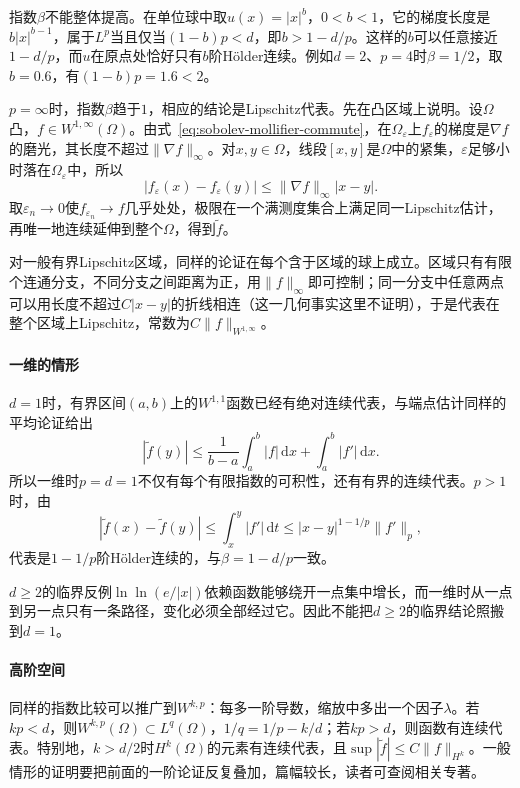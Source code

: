 指数$\beta$不能整体提高。在单位球中取$u(x)=|x|^b$，$0<b<1$，它的梯度长度是$b|x|^{b-1}$，属于$L^p$当且仅当$(1-b)p<d$，即$b>1-d/p$。这样的$b$可以任意接近$1-d/p$，而$u$在原点处恰好只有$b$阶Hölder连续。例如$d=2$、$p=4$时$\beta=1/2$，取$b=0.6$，有$(1-b)p=1.6<2$。

$p=\infty$时，指数$\beta$趋于$1$，相应的结论是Lipschitz代表。先在凸区域上说明。设$\Omega$凸，$f\in W^{1,\infty}(\Omega)$。由式~\eqref{eq:sobolev-mollifier-commute}，在$\Omega_\varepsilon$上$f_\varepsilon$的梯度是$\nabla f$的磨光，其长度不超过$\lVert\nabla f\rVert_\infty$。对$x,y\in\Omega$，线段$[x,y]$是$\Omega$中的紧集，$\varepsilon$足够小时落在$\Omega_\varepsilon$中，所以
\[
|f_\varepsilon(x)-f_\varepsilon(y)|\leq\lVert\nabla f\rVert_\infty|x-y| .
\]
取$\varepsilon_n\to0$使$f_{\varepsilon_n}\to f$几乎处处，极限在一个满测度集合上满足同一Lipschitz估计，再唯一地连续延伸到整个$\Omega$，得到$\tilde f$。

对一般有界Lipschitz区域，同样的论证在每个含于区域的球上成立。区域只有有限个连通分支，不同分支之间距离为正，用$\lVert f\rVert_\infty$即可控制；同一分支中任意两点可以用长度不超过$C|x-y|$的折线相连（这一几何事实这里不证明），于是代表在整个区域上Lipschitz，常数为$C\lVert f\rVert_{W^{1,\infty}}$。

\paragraph{一维的情形}
$d=1$时，有界区间$(a,b)$上的$W^{1,1}$函数已经有绝对连续代表，与端点估计同样的平均论证给出
\[
|\tilde f(y)|\leq\frac1{b-a}\int_a^b|f|\,\mathrm dx+\int_a^b|f'|\,\mathrm dx .
\]
所以一维时$p=d=1$不仅有每个有限指数的可积性，还有有界的连续代表。$p>1$时，由
\[
|\tilde f(x)-\tilde f(y)|\leq\int_x^y|f'|\,\mathrm dt\leq|x-y|^{1-1/p}\lVert f'\rVert_p,
\]
代表是$1-1/p$阶Hölder连续的，与$\beta=1-d/p$一致。

$d\geq2$的临界反例$\ln\ln(e/|x|)$依赖函数能够绕开一点集中增长，而一维时从一点到另一点只有一条路径，变化必须全部经过它。因此不能把$d\geq2$的临界结论照搬到$d=1$。

\paragraph{高阶空间}
同样的指数比较可以推广到$W^{k,p}$：每多一阶导数，缩放中多出一个因子$\lambda$。若$kp<d$，则$W^{k,p}(\Omega)\subset L^q(\Omega)$，$1/q=1/p-k/d$；若$kp>d$，则函数有连续代表。特别地，$k>d/2$时$H^k(\Omega)$的元素有连续代表，且$\sup|\tilde f|\leq C\lVert f\rVert_{H^k}$。一般情形的证明要把前面的一阶论证反复叠加，篇幅较长，读者可查阅相关专著。

